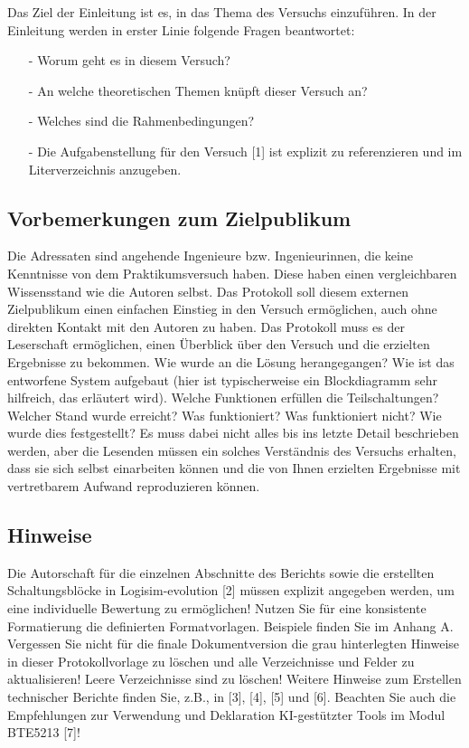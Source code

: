 Das Ziel der Einleitung ist es, in das Thema des Versuchs einzuführen. In der Einleitung werden in erster Linie folgende Fragen beantwortet:
\begin{itemize}
    \item[-] Worum geht es in diesem Versuch?
    \item[-] An welche theoretischen Themen knüpft dieser Versuch an?
    \item[-] Welches sind die Rahmenbedingungen? 
    \item[-] Die Aufgabenstellung für den Versuch [1] ist explizit zu referenzieren und im Literverzeichnis anzugeben.
\end{itemize}

\subsection{Vorbemerkungen zum Zielpublikum}
Die Adressaten sind angehende Ingenieure bzw. Ingenieurinnen, die keine Kenntnisse von dem Praktikumsversuch haben. Diese haben einen vergleichbaren Wissensstand wie die Autoren selbst. Das Protokoll soll diesem externen Zielpublikum einen einfachen Einstieg in den Versuch ermöglichen, auch ohne direkten Kontakt mit den Autoren zu haben.
Das Protokoll muss es der Leserschaft ermöglichen, einen Überblick über den Versuch und die erzielten Ergebnisse zu bekommen. Wie wurde an die Lösung herangegangen? Wie ist das entworfene System aufgebaut (hier ist typischerweise ein Blockdiagramm sehr hilfreich, das erläutert wird). Welche Funktionen erfüllen die Teilschaltungen? Welcher Stand wurde erreicht? Was funktioniert? Was funktioniert nicht? Wie wurde dies festgestellt?
Es muss dabei nicht alles bis ins letzte Detail beschrieben werden, aber die Lesenden müssen ein solches Verständnis des Versuchs erhalten, dass sie sich selbst einarbeiten können und die von Ihnen erzielten Ergebnisse mit vertretbarem Aufwand reproduzieren können.

\subsection{Hinweise}
Die Autorschaft für die einzelnen Abschnitte des Berichts sowie die erstellten Schaltungsblöcke in Logisim-evolution [2] müssen explizit angegeben werden, um eine individuelle Bewertung zu ermöglichen!
Nutzen Sie für eine konsistente Formatierung die definierten Formatvorlagen. Beispiele finden Sie im Anhang A. Vergessen Sie nicht für die finale Dokumentversion die grau hinterlegten Hinweise in dieser Protokollvorlage zu löschen und alle Verzeichnisse und Felder zu aktualisieren! Leere Verzeichnisse sind zu löschen!
Weitere Hinweise zum Erstellen technischer Berichte finden Sie, z.B., in [3], [4], [5] und [6]. Beachten Sie auch die Empfehlungen zur Verwendung und Deklaration KI-gestützter Tools im Modul BTE5213 [7]!